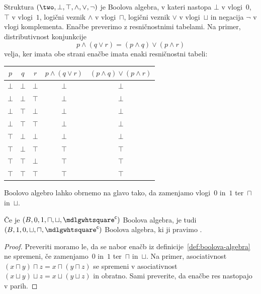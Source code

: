 \begin{zgled}
  \label{zgled:boolova-algebra-dve}
  Struktura $(\two, \bot, \top, {\land}, {\lor}, {\neg})$ je Boolova algebra, v kateri nastopa $\bot$ v vlogi~$0$, $\top$ v vlogi~$1$, logični veznik $\land$ v vlogi~$\sqcap$, logični veznik $\lor$ v vlogi~$\sqcup$ in negacija $\neg$ v vlogi komplementa.
  Enačbe preverimo z resničnostnimi tabelami.
  Na primer, distributivnost konjunkcije
  \begin{equation*}
    p \land (q \lor r) = (p \land q) \lor (p \land r)
  \end{equation*}
  velja, ker imata obe strani enačbe imata enaki resničnostni tabeli:
  \begin{center}
    \small
    \begin{tabular}{ccccc}
      \toprule
      $p$ & $q$ & $r$ & $p \land (q \lor r)$ & $(p \land q) \lor (p \land r)$ \\ \midrule
      $\bot$ & $\bot$ & $\bot$ & $\bot$ & $\bot$ \\
      $\bot$ & $\bot$ & $\top$ & $\bot$ & $\bot$ \\
      $\bot$ & $\top$ & $\bot$ & $\bot$ & $\bot$ \\
      $\bot$ & $\top$ & $\top$ & $\bot$ & $\bot$ \\
      $\top$ & $\bot$ & $\bot$ & $\bot$ & $\bot$ \\
      $\top$ & $\bot$ & $\top$ & $\top$ & $\top$ \\
      $\top$ & $\top$ & $\bot$ & $\top$ & $\top$ \\
      $\top$ & $\top$ & $\top$ & $\top$ & $\top$ \\
      \bottomrule
    \end{tabular}
  \end{center}
\end{zgled}

Boolovo algebro lahko obrnemo na glavo tako, da zamenjamo vlogi~$0$ in~$1$ ter~$\sqcap$ in~$\sqcup$.

\begin{trditev}
  \label{trditev:dualna-boolova-algebra}
  Če je $(B, 0, 1, \sqcap, \sqcup, \compl{\Box})$ Boolova algebra, je tudi $(B, 1, 0, \sqcup, \sqcap, \compl{\Box})$ Boolova algebra, ki ji pravimo .
\end{trditev}

\begin{proof}
  Preveriti moramo le, da se nabor enačb iz definicije~\ref{def:boolova-algebra} ne spremeni, če zamenjamo~$0$ in~$1$ ter~$\sqcap$ in~$\sqcup$. Na primer, asociativnost $(x \sqcap y) \sqcap z = x \sqcap (y \sqcap z)$ se spremeni v asociativnost $(x \sqcup y) \sqcup z = x \sqcup (y \sqcup z)$ in obratno.
  Sami preverite, da enačbe res nastopajo v parih.
\end{proof}

